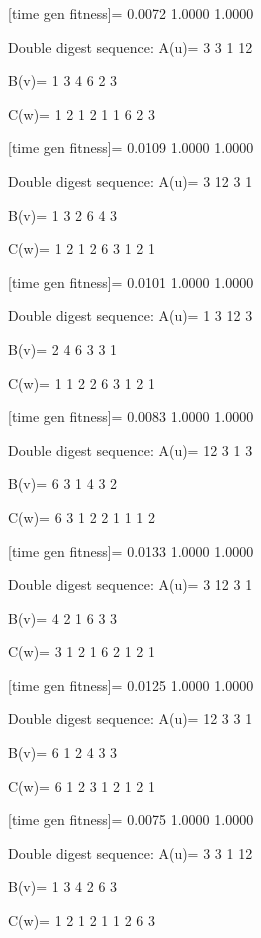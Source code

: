 [time gen fitness]=
    0.0072    1.0000    1.0000

Double digest sequence:
A(u)=
     3     3     1    12

B(v)=
     1     3     4     6     2     3

C(w)=
     1     2     1     2     1     1     6     2     3

[time gen fitness]=
    0.0109    1.0000    1.0000

Double digest sequence:
A(u)=
     3    12     3     1

B(v)=
     1     3     2     6     4     3

C(w)=
     1     2     1     2     6     3     1     2     1

[time gen fitness]=
    0.0101    1.0000    1.0000

Double digest sequence:
A(u)=
     1     3    12     3

B(v)=
     2     4     6     3     3     1

C(w)=
     1     1     2     2     6     3     1     2     1

[time gen fitness]=
    0.0083    1.0000    1.0000

Double digest sequence:
A(u)=
    12     3     1     3

B(v)=
     6     3     1     4     3     2

C(w)=
     6     3     1     2     2     1     1     1     2

[time gen fitness]=
    0.0133    1.0000    1.0000

Double digest sequence:
A(u)=
     3    12     3     1

B(v)=
     4     2     1     6     3     3

C(w)=
     3     1     2     1     6     2     1     2     1

[time gen fitness]=
    0.0125    1.0000    1.0000

Double digest sequence:
A(u)=
    12     3     3     1

B(v)=
     6     1     2     4     3     3

C(w)=
     6     1     2     3     1     2     1     2     1

[time gen fitness]=
    0.0075    1.0000    1.0000

Double digest sequence:
A(u)=
     3     3     1    12

B(v)=
     1     3     4     2     6     3

C(w)=
     1     2     1     2     1     1     2     6     3

